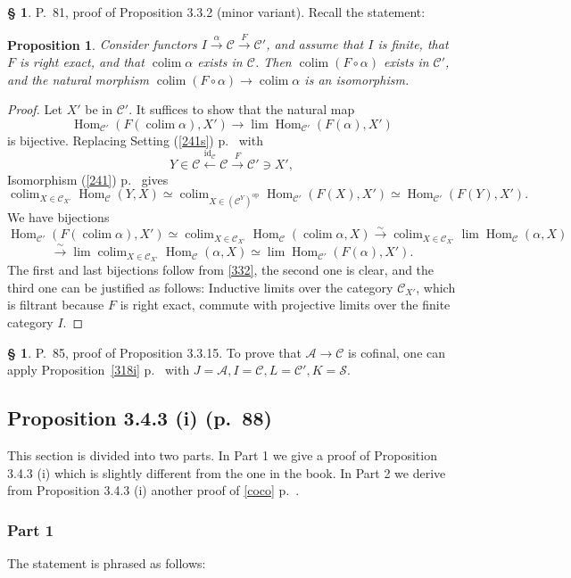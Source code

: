 \documentclass[12pt]{article}
\newtheorem{prop}[thm]{Proposition}
\theoremstyle{remark}
\theoremstyle{definition}
\newtheorem{s}[thm]{\S}
\newcommand{\cc}{\mathcal}
\newcommand{\A}{\mathcal A}
\newcommand{\C}{\mathcal C}
\newcommand{\xr}{\xrightarrow}
\newcommand{\mv}{ (minor variant)}
\DeclareMathOperator*{\co}{colim}
\DeclareMathOperator{\id}{id}
\DeclareMathOperator{\Hom}{Hom}%
\DeclareMathOperator{\op}{op}
\begin{document}
%
%
\begin{s} P.~81, proof of Proposition 3.3.2\mv. Recall the statement:
%
\begin{prop} 
%
Consider functors $I\xrightarrow\alpha\C\xrightarrow F\C'$, and assume that $I$ is finite, that $F$ is right exact, and that $\co\alpha$ exists in $\C$. Then $\co(F\circ\alpha)$ exists in $\C'$, and the natural morphism $\co(F\circ\alpha)\to\co\alpha$ is an isomorphism. 
%
\end{prop} 
%
\begin{proof}
Let $X'$ be in $\C'$. It suffices to show that the natural map 
$$
\Hom_{\C'}(F(\co\alpha),X')\to\lim\Hom_{\C'}(F(\alpha),X')
$$ 
%
is bijective. Replacing Setting (\ref{241s}) p.~\pageref{241s} with 
$$
Y\in\C\xleftarrow{\id_\C}\C\xrightarrow{F}\C'\ni X', 
$$ 
Isomorphism (\ref{241}) p.~\pageref{241} gives 
%
\begin{equation}\label{332} 
\co_{X\in\C_{X'}}\Hom_\C(Y,X)\simeq\co_{X\in(\C^Y)^{\op}}\Hom_{\C'}(F(X),X')\simeq\Hom_{\C'}(F(Y),X').
\end{equation} 
%
We have bijections 
$$ 
\Hom_{\C'}(F(\co\alpha),X')\simeq\co_{X\in\C_{X'}}\Hom_\C(\co\alpha,X)\xr\sim\co_{X\in\C_{X'}}\lim\Hom_\C(\alpha,X) 
$$ 
$$
\xr\sim\lim\co_{X\in\C_{X'}}\Hom_\C(\alpha,X)\simeq\lim\Hom_{\C'}(F(\alpha),X'). 
$$ 
The first and last bijections follow from \eqref{332}, the second one is clear, and the third one can be justified as follows: Inductive limits over the category $\C_{X'}$, which is filtrant because $F$ is right exact, commute with projective limits over the finite category $I$.
\end{proof}
\end{s}
%
%
\begin{s}\label{3315}
P.~85, proof of Proposition 3.3.15. To prove that $\A\to\C$ is cofinal, one can apply Proposition~\ref{318i} p.~\pageref{318i} with $J=\A,I=\C,L=\C',K=\cc S$. 
\end{s}
%
%
\subsection{Proposition 3.4.3 (i) (p.~88)}
%
This section is divided into two parts. In Part 1 we give a proof of Proposition 3.4.3 (i) which is slightly different from the one in the book. In Part 2 we derive from Proposition 3.4.3 (i) another proof of \eqref{coco} p.~\pageref{coco}. 
%
\subsubsection{Part 1} 
%
The statement is phrased as follows: 
\end{document}
